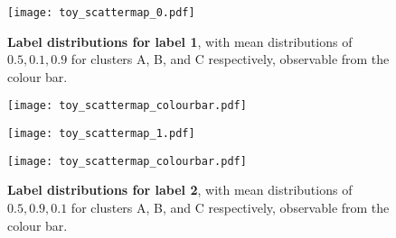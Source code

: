 \begin{figure}[H]
    \centering
    \begin{minipage}{0.85\linewidth}
        \texttt{[image: toy\_scattermap\_0.pdf]}
        \caption*{\textbf{Label distributions for label 1}, with mean distributions of $0.5, 0.1, 0.9$ for clusters A, B, and C respectively, observable from the colour bar.}
    \end{minipage}
    \begin{minipage}{0.09\linewidth}
        \texttt{[image: toy\_scattermap\_colourbar.pdf]}
    \end{minipage}
    \begin{minipage}{0.85\linewidth}
        \texttt{[image: toy\_scattermap\_1.pdf]}
        \caption*{\textbf{Label distributions for label 2}, with mean distributions of $0.5, 0.9, 0.1$ for clusters A, B, and C respectively, observable from the colour bar.}
    \end{minipage}
    \begin{minipage}{0.09\linewidth}
        \texttt{[image: toy\_scattermap\_colourbar.pdf]}
    \end{minipage}
\end{figure}



